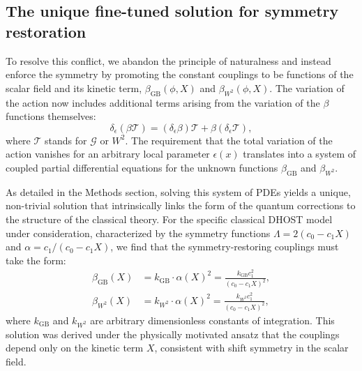 \documentclass[twocolumn]{aastex631}
\begin{document}
\subsection{The unique fine-tuned solution for symmetry restoration}
To resolve this conflict, we abandon the principle of naturalness and instead enforce the symmetry by promoting the constant couplings to be functions of the scalar field and its kinetic term, $\beta_{\text{GB}}(\phi, X)$ and $\beta_{W^2}(\phi, X)$. The variation of the action now includes additional terms arising from the variation of the $\beta$ functions themselves:
\begin{equation}
\delta_\epsilon (\beta \mathcal{T}) = (\delta_\epsilon \beta) \mathcal{T} + \beta (\delta_\epsilon \mathcal{T}),
\end{equation}
where $\mathcal{T}$ stands for $\mathcal{G}$ or $W^2$. The requirement that the total variation of the action vanishes for an arbitrary local parameter $\epsilon(x)$ translates into a system of coupled partial differential equations for the unknown functions $\beta_{\text{GB}}$ and $\beta_{W^2}$.

As detailed in the Methods section, solving this system of PDEs yields a unique, non-trivial solution that intrinsically links the form of the quantum corrections to the structure of the classical theory. For the specific classical DHOST model under consideration, characterized by the symmetry functions $\Lambda = 2(c_0 - c_1 X)$ and $\alpha = c_1 / (c_0 - c_1 X)$, we find that the symmetry-restoring couplings must take the form:
\begin{align}
\beta_{\text{GB}}(X) &= k_{\text{GB}} \cdot \alpha(X)^2 = \frac{k_{\text{GB}} c_1^2}{(c_0 - c_1 X)^2}, \label{eq:beta_gb_sol} \\
\beta_{W^2}(X) &= k_{W^2} \cdot \alpha(X)^2 = \frac{k_{W^2} c_1^2}{(c_0 - c_1 X)^2}, \label{eq:beta_w2_sol}
\end{align}
where $k_{\text{GB}}$ and $k_{W^2}$ are arbitrary dimensionless constants of integration. This solution was derived under the physically motivated ansatz that the couplings depend only on the kinetic term $X$, consistent with shift symmetry in the scalar field.
\end{document}
